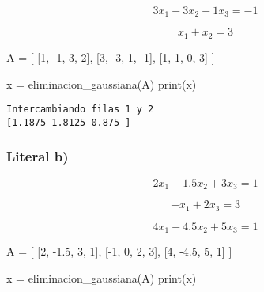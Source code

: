 \documentclass[
  letterpaper,
  DIV=11,
  numbers=noendperiod]{scrartcl}
\newenvironment{Shaded}{\begin{snugshade}}{\end{snugshade}}
\newcommand{\BuiltInTok}[1]{\textcolor[rgb]{0.00,0.23,0.31}{#1}}
\newcommand{\DecValTok}[1]{\textcolor[rgb]{0.68,0.00,0.00}{#1}}
\newcommand{\FloatTok}[1]{\textcolor[rgb]{0.68,0.00,0.00}{#1}}
\newcommand{\NormalTok}[1]{\textcolor[rgb]{0.00,0.23,0.31}{#1}}
\newcommand{\OperatorTok}[1]{\textcolor[rgb]{0.37,0.37,0.37}{#1}}
\begin{document}
\[3x_1 - 3x_2 + 1x_3= - 1\]

\[x_1 + x_2  = 3\]

\begin{Shaded}
\begin{Highlighting}[]

\NormalTok{A }\OperatorTok{=}\NormalTok{ [}
\NormalTok{    [}\DecValTok{1}\NormalTok{, }\OperatorTok{{-}}\DecValTok{1}\NormalTok{, }\DecValTok{3}\NormalTok{, }\DecValTok{2}\NormalTok{],}
\NormalTok{    [}\DecValTok{3}\NormalTok{, }\OperatorTok{{-}}\DecValTok{3}\NormalTok{, }\DecValTok{1}\NormalTok{, }\OperatorTok{{-}}\DecValTok{1}\NormalTok{],}
\NormalTok{    [}\DecValTok{1}\NormalTok{, }\DecValTok{1}\NormalTok{, }\DecValTok{0}\NormalTok{, }\DecValTok{3}\NormalTok{]}
\NormalTok{]}

\NormalTok{x }\OperatorTok{=}\NormalTok{ eliminacion\_gaussiana(A)}
\BuiltInTok{print}\NormalTok{(x)}
\end{Highlighting}
\end{Shaded}

\begin{verbatim}
Intercambiando filas 1 y 2
[1.1875 1.8125 0.875 ]
\end{verbatim}

\subsubsection{Literal b)}\label{literal-b-2}

\[2x_1 - 1.5x_2 + 3x_3 = 1\]

\[-x_1 + 2x_3 = 3\]

\[4x_1 - 4.5x_2 + 5x_3 = 1\]

\begin{Shaded}
\begin{Highlighting}[]

\NormalTok{A }\OperatorTok{=}\NormalTok{ [}
\NormalTok{    [}\DecValTok{2}\NormalTok{, }\OperatorTok{{-}}\FloatTok{1.5}\NormalTok{, }\DecValTok{3}\NormalTok{, }\DecValTok{1}\NormalTok{],}
\NormalTok{    [}\OperatorTok{{-}}\DecValTok{1}\NormalTok{, }\DecValTok{0}\NormalTok{, }\DecValTok{2}\NormalTok{, }\DecValTok{3}\NormalTok{],}
\NormalTok{    [}\DecValTok{4}\NormalTok{, }\OperatorTok{{-}}\FloatTok{4.5}\NormalTok{, }\DecValTok{5}\NormalTok{, }\DecValTok{1}\NormalTok{]}
\NormalTok{]}

\NormalTok{x }\OperatorTok{=}\NormalTok{ eliminacion\_gaussiana(A)}
\BuiltInTok{print}\NormalTok{(x)}
\end{Highlighting}
\end{Shaded}
\end{document}
